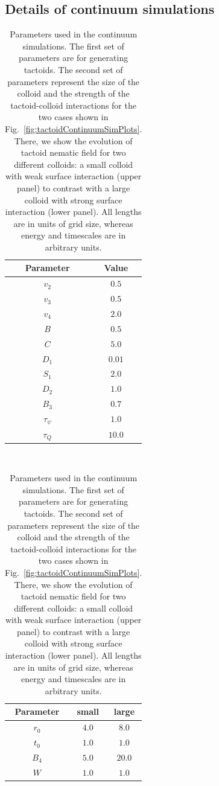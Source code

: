 \documentclass[%
 aip,
 amsmath,amssymb,
 reprint,%
]{revtex4-1}
\begin{document}
\subsection{Details of continuum simulations} \label{ss:tactoidContinuumSimDetails}
\begin{table}[h]
	\centering
	\label{table1}
	\begin{tabular}{|c|c|}
		 \hline
	
		{\bf Parameter} & 	{\bf Value} \\
		
		\hline 
		
	$v_2$  & $0.5$	 \\
    $v_3$  & $0.5$	 \\	
    $v_4$  & $2.0$  \\
    $B$  & $0.5$ \\
    $C$ & $5.0$ \\
    $D_{1}$ & $0.01$\\
    $S_{1}$ & $2.0$ \\
    $D_{2}$ & $1.0$ \\
    $B_{3}$ & $0.7$\\
    $\tau_{\psi}$ & $1.0$\\
    $\tau_Q$ & $10.0$ \\
    \hline
   \end{tabular}
   \\
     \begin{tabular}{|c|c|c|}
     \hline
     {\bf Parameter} & 	{small} & {large} \\ 
	\hline 
    $r_{0}$ & $4.0$ & $8.0$\\
    $t_{0}$ & $1.0$ & $1.0$ \\
    $B_{4}$ & $5.0$ & $20.0$\\
    $W$ & $1.0$  & $1.0$\\
	\hline
	\end{tabular}
    \caption{Parameters used in the continuum simulations. The first set of parameters are for generating tactoids. The second set of parameters represent the size of the colloid and the strength of the tactoid-colloid interactions for the two cases shown in Fig.~\ref{fig:tactoidContinuumSimPlots}. There, we show the evolution of tactoid nematic field for two different colloids: a small colloid with weak surface interaction (upper panel) to contrast with a large colloid with strong surface interaction (lower panel). All lengths are in units of grid size, whereas energy and timescales are in arbitrary units. }
\end{table}
\end{document}
